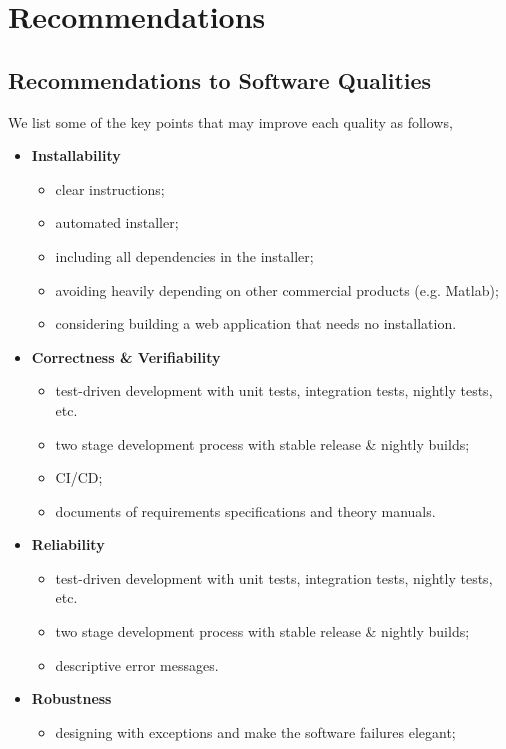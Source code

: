 \chapter{Recommendations}
\label{ch_recommendations}

\section{Recommendations to Software Qualities}

We list some of the key points that may improve each quality as follows,
\begin{itemize}
\item \textbf{Installability}
\begin{itemize}
    \item clear instructions;
    \item automated installer;
    \item including all dependencies in the installer;
    \item avoiding heavily depending on other commercial products (e.g. Matlab);
    \item considering building a web application that needs no installation.
\end{itemize}
\item \textbf{Correctness \& Verifiability}
\begin{itemize}
    \item test-driven development with unit tests, integration tests, nightly tests, etc.
    \item two stage development process with stable release \& nightly builds;
    \item CI/CD;
    \item documents of requirements specifications and theory manuals.
\end{itemize}
\item \textbf{Reliability}
\begin{itemize}
    \item test-driven development with unit tests, integration tests, nightly tests, etc.
    \item two stage development process with stable release \& nightly builds;
    \item descriptive error messages.
\end{itemize}
\item \textbf{Robustness}
\begin{itemize}
    \item designing with exceptions and make the software failures elegant;

\end{itemize}
\end{itemize}
